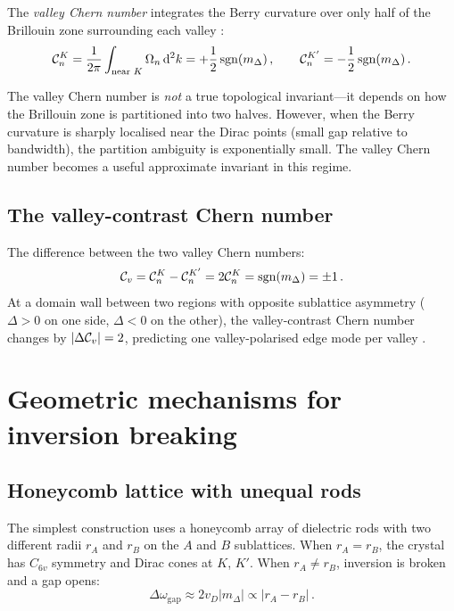 The \emph{valley Chern number} integrates the Berry curvature over only
half of the Brillouin zone surrounding each valley
\cite{dong2016valley,noh2017observation}:
\begin{equation}\label{eq:ch12-valley-chern}
  \mathcal{C}_n^K = \frac{1}{2\pi}\int_{\text{near }K}\Omega_n\,\mathrm{d}^2k
  = +\frac{1}{2}\operatorname{sgn}(m_\Delta)\,,
  \qquad
  \mathcal{C}_n^{K'} = -\frac{1}{2}\operatorname{sgn}(m_\Delta)\,.
\end{equation}

\begin{remark}
The valley Chern number is \emph{not} a true topological invariant---it
depends on how the Brillouin zone is partitioned into two halves.
However, when the Berry curvature is sharply localised near the Dirac
points (small gap relative to bandwidth), the partition ambiguity is
exponentially small.  The valley Chern number becomes a useful
approximate invariant in this regime.
\end{remark}

\subsection{The valley-contrast Chern number}
\label{sec:ch12-valley-contrast}

The difference between the two valley Chern numbers:
\begin{equation}\label{eq:ch12-Cv}
  \mathcal{C}_v = \mathcal{C}_n^K - \mathcal{C}_n^{K'} = 2\mathcal{C}_n^K
  = \operatorname{sgn}(m_\Delta) = \pm 1\,.
\end{equation}
At a domain wall between two regions with opposite sublattice asymmetry
($\Delta>0$ on one side, $\Delta<0$ on the other), the valley-contrast
Chern number changes by $|\Delta\mathcal{C}_v|=2$, predicting one
valley-polarised edge mode per valley
\cite{wu2017direct,noh2018observation}.

\section{Geometric mechanisms for inversion breaking}
\label{sec:ch12-geometric}

\subsection{Honeycomb lattice with unequal rods}
\label{sec:ch12-unequal-rods}

The simplest construction uses a honeycomb array of dielectric rods
with two different radii $r_A$ and $r_B$ on the $A$ and $B$ sublattices.
When $r_A=r_B$, the crystal has $C_{6v}$ symmetry and Dirac cones at
$K$, $K'$.  When $r_A\neq r_B$, inversion is broken and a gap opens:
\begin{equation}
  \Delta\omega_{\mathrm{gap}} \approx 2v_D|m_\Delta|
  \propto |r_A-r_B|\,.
\end{equation}

